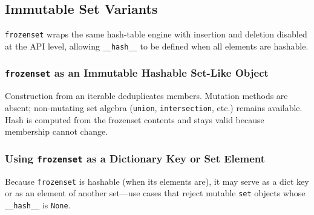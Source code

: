 \subsection{Immutable Set Variants}

\texttt{frozenset} wraps the same hash-table engine with insertion and deletion disabled at the API level, allowing \texttt{\_\_hash\_\_} to be defined when all elements are hashable.

\subsubsection{\texttt{frozenset} as an Immutable Hashable Set-Like Object}

Construction from an iterable deduplicates members. Mutation methods are absent; non-mutating set algebra (\texttt{union}, \texttt{intersection}, etc.) remains available. Hash is computed from the frozenset contents and stays valid because membership cannot change.

\subsubsection{Using \texttt{frozenset} as a Dictionary Key or Set Element}

Because \texttt{frozenset} is hashable (when its elements are), it may serve as a dict key or as an element of another set---use cases that reject mutable \texttt{set} objects whose \texttt{\_\_hash\_\_} is \texttt{None}.
